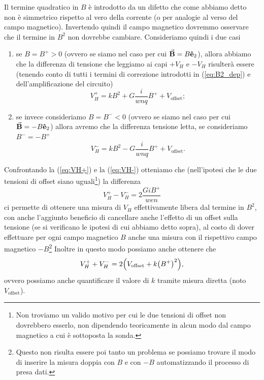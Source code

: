 \documentclass[fleqn,varvw,preprintnumbers,citeautoscript]{memo}
\begin{document}
Il termine quadratico in $B$ è introdotto da un difetto che come abbiamo detto non è simmetrico rispetto al vero della corrente (o per analogie al verso del campo magnetico). Invertendo quindi il campo magnetico dovremmo osservare che il termine in $B^2$ non dovrebbe cambiare. Consideriamo quindi i due casi \begin{enumerate}[1.]
    \item se $B=B^+>0$ (ovvero se siamo nel caso per cui $\va{B} = B\vu{e}_2$), allora abbiamo che la differenza di tensione che leggiamo ai capi $+V_H$ e $-V_H$ risulterà essere (tenendo conto di tutti i termini di correzione introdotti in (\ref{eq:B2_dep}) e dell'amplificazione del circuito) \begin{equation}
        V_H^+ = kB^2 + G\frac{i}{wnq}B^+ + V_\text{offset};\label{eq:VH+}
    \end{equation}
    \item se invece consideriamo $B=B^-<0$ (ovvero se siamo nel caso per cui $\va{B} = -B\vu{e}_2$) allora avremo che la differenza tensione letta, se consideriamo $B^- = -B^+$ \begin{equation}
        V_H^- = kB^2 - G\frac{i}{wnq}B^+ + V_\text{offset}.\label{eq:VH-}
    \end{equation}
\end{enumerate}
Confrontando la (\ref{eq:VH+}) e la (\ref{eq:VH-}) otteniamo che (nell'ipotesi che le due tensioni di offset siano uguali\footnote{Non troviamo un valido motivo per cui le due tensioni di offset non dovrebbero esserlo, non dipendendo teoricamente in alcun modo dal campo magnetico a cui è sottoposta la sonda.}) la differenza \begin{equation}
    V_H^+ - V_H^- = 2\frac{GiB^+}{wen}
\end{equation} ci permette di ottenere una misura di $V_H$ effettivamente libera dal termine in $B^2$, con anche l'aggiunto beneficio di cancellare anche l'effetto di un offset sulla tensione (se si verificano le ipotesi di cui abbiamo detto sopra), al costo di dover effettuare per ogni campo magnetico $B$ anche una misura con il rispettivo campo magnetico $-B$\footnote{Questo non risulta essere poi tanto un problema se possiamo trovare il modo di inserire la misura doppia con $B$ e con $-B$ automatizzando il processo di presa dati.} Inoltre in questo modo possiamo anche ottenere che \begin{equation}
    V_H^++V_H^- = 2\qty(V_\text{offset} + k\qty(B^+)^2),
\end{equation} ovvero possiamo anche quantificare il valore di $k$ tramite misura diretta (noto $V_\text{offset}$).
\end{document}
